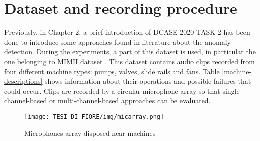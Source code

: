 \section{Dataset and recording procedure}
Previously, in Chapter 2, a brief introduction of DCASE 2020 TASK 2 has been done to introduce some approaches found in literature about the anomaly detection. During the experiments, a part of this dataset is used, in particular the one belonging to MIMII dataset \cite{20MIMIIDataset}.
This dataset contains audio clips recorded from four different machine types: pumps, valves, slide rails and fans. Table \ref{machine-descriptions} shows information about their operations and possible failures that could occur. Clips are recorded by a circular microphone array so that single-channel-based or multi-channel-based approaches can be evaluated.
\begin{figure}[ht]
\texttt{[image: TESI DI FIORE/img/micarray.png]}
\centering
\caption{Microphones array disposed near machines \cite{DCASE}}
\label{micarray}
\end{figure}
